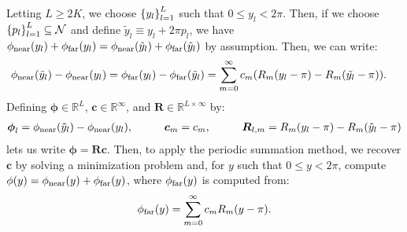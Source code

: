 Letting $L \geq 2K$, we choose $\left\{y_l\right\}_{l=1}^L$ such that
$0 \leq y_l < 2\pi$. Then, if we choose
$\left\{p_l\right\}_{l=1}^L \subseteq \mathcal{N}$ and define
$\tilde{y}_l \equiv y_l + 2\pi p_l$, we have
$\phi_{\operatorname{near}}(y_l) + \phi_{\operatorname{far}}(y_l) = \phi_{\operatorname{near}}(\tilde{y}_l) +
\phi_{\operatorname{far}}(\tilde{y}_l)$ by assumption. Then, we can write:
\begin{align*}
  \phi_{\operatorname{near}}(\tilde{y}_l) - \phi_{\operatorname{near}}(y_l) &= \phi_{\operatorname{far}}(y_l) - \phi_{\operatorname{far}}(\tilde{y}_l) = \sum_{m=0}^\infty c_m (R_m(y_l - \pi) - R_m(\tilde{y_l} - \pi)).
\end{align*}
Defining $\boldsymbol{\phi} \in \mathbb{R}^{L}$, $\boldsymbol{c} \in \mathbb{R}^\infty$, and $\boldsymbol{R} \in \mathbb{R}^{L \times \infty}$
by:
\begin{align*}
  \boldsymbol{\phi}_l = \phi_{\operatorname{near}}(\tilde{y}_l) - \phi_{\operatorname{near}}(y_l), \hspace{1cm} \boldsymbol{c}_m = c_m, \hspace{1cm} \boldsymbol{R}_{l,m} = R_m(y_l - \pi) - R_m(\tilde{y}_l - \pi)
\end{align*}
lets us write $\boldsymbol{\phi} = \boldsymbol{R}
\boldsymbol{c}$. Then, to apply the periodic summation method, we
recover $\boldsymbol{c}$ by solving a minimization problem and, for
$y$ such that $0 \leq y < 2\pi$, compute
$\phi(y) = \phi_{\operatorname{near}}(y) + \phi_{\operatorname{far}}(y)$, where $\phi_{\operatorname{far}}(y)$ is computed
from:
\begin{align*}
  \phi_{\operatorname{far}}(y) = \sum_{m=0}^\infty c_m R_m(y - \pi).
\end{align*}
